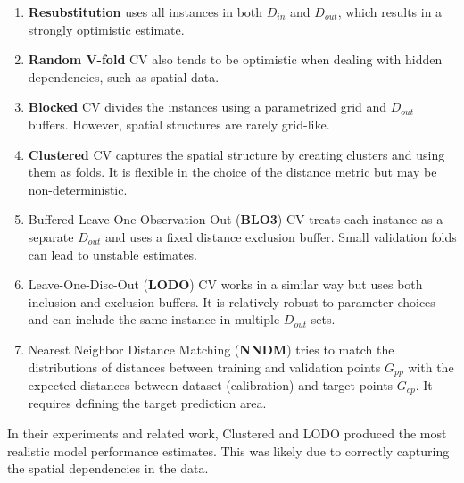 \documentclass[fleqn,moreauthors,10pt]{ds_report}
\begin{document}
\begin{enumerate}
    \item \textbf{Resubstitution} uses all instances in both $D_{in}$ and $D_{out}$, which results in a strongly optimistic estimate.
    \item \textbf{Random V-fold} CV also tends to be optimistic when dealing with hidden dependencies, such as spatial data.
    \item \textbf{Blocked} CV divides the instances using a parametrized grid and $D_{out}$ buffers. However, spatial structures are rarely grid-like.
    \item \textbf{Clustered} CV captures the spatial structure by creating clusters and using them as folds. It is flexible in the choice of the distance metric but may be non-deterministic.
    \item Buffered Leave-One-Observation-Out (\textbf{BLO3}) CV treats each instance as a separate $D_{out}$ and uses a fixed distance exclusion buffer. Small validation folds can lead to unstable estimates. 
    \item Leave-One-Disc-Out (\textbf{LODO}) CV works in a similar way but uses both inclusion and exclusion buffers. It is relatively robust to parameter choices and can include the same instance in multiple $D_{out}$ sets.
    \item Nearest Neighbor Distance Matching (\textbf{NNDM}) tries to match the distributions of distances between training and validation points $G_{pp}$ with the expected distances between dataset (calibration) and target points $G_{cp}$. It requires defining the target prediction area.
\end{enumerate}

In their experiments and related work, Clustered and LODO produced the most realistic model performance estimates. This was likely due to correctly capturing the spatial dependencies in the data.



\end{document}
